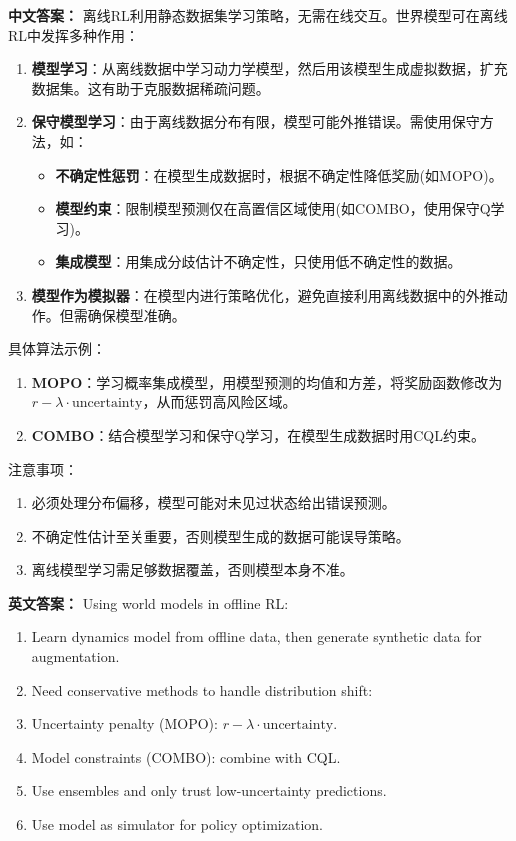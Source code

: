 \documentclass[10pt,a4paper]{ctexart}
\begin{document}
\textbf{中文答案：}  
离线RL利用静态数据集学习策略，无需在线交互。世界模型可在离线RL中发挥多种作用：

\begin{enumerate}
    \item \textbf{模型学习}：从离线数据中学习动力学模型，然后用该模型生成虚拟数据，扩充数据集。这有助于克服数据稀疏问题。
    \item \textbf{保守模型学习}：由于离线数据分布有限，模型可能外推错误。需使用保守方法，如：
        \begin{itemize}
            \item \textbf{不确定性惩罚}：在模型生成数据时，根据不确定性降低奖励(如MOPO)。
            \item \textbf{模型约束}：限制模型预测仅在高置信区域使用(如COMBO，使用保守Q学习)。
            \item \textbf{集成模型}：用集成分歧估计不确定性，只使用低不确定性的数据。
        \end{itemize}
    \item \textbf{模型作为模拟器}：在模型内进行策略优化，避免直接利用离线数据中的外推动作。但需确保模型准确。
\end{enumerate}

具体算法示例：
\begin{enumerate}
    \item \textbf{\textbf{MOPO}}：学习概率集成模型，用模型预测的均值和方差，将奖励函数修改为 $r - \lambda \cdot \text{uncertainty}$，从而惩罚高风险区域。
    \item \textbf{\textbf{COMBO}}：结合模型学习和保守Q学习，在模型生成数据时用CQL约束。
\end{enumerate}

注意事项：
\begin{enumerate}
    \item 必须处理分布偏移，模型可能对未见过状态给出错误预测。
    \item 不确定性估计至关重要，否则模型生成的数据可能误导策略。
    \item 离线模型学习需足够数据覆盖，否则模型本身不准。
\end{enumerate}

\textbf{英文答案：}  
Using world models in offline RL:

\begin{enumerate}
    \item Learn dynamics model from offline data, then generate synthetic data for augmentation.
    \item Need conservative methods to handle distribution shift:
        \item Uncertainty penalty (MOPO): $r - \lambda \cdot \text{uncertainty}$.
        \item Model constraints (COMBO): combine with CQL.
        \item Use ensembles and only trust low-uncertainty predictions.
    \item Use model as simulator for policy optimization.
\end{enumerate}
\end{document}
